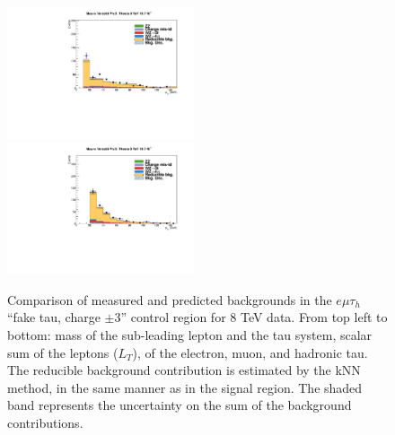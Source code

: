 \begin{figure}
\begin{center}
  \includegraphics[width=0.49\textwidth]{4_Analisys/pics/8TeV/plots/emt/f3/Full_charge3/final-f3-mPt-Full.pdf}\\
  \includegraphics[width=0.49\textwidth]{4_Analisys/pics/8TeV/plots/emt/f3/Full_charge3/final-f3-tPt-Full.pdf}
  \caption{Comparison of measured and predicted backgrounds in the $e\mu\tau_h$ ``fake tau, charge $\pm3$'' control region for 8 TeV data.
  From top left to bottom: mass of the sub-leading lepton and the tau system, scalar sum of the leptons \pT ($L_T$), \pT of the electron, muon, and hadronic tau.
  The reducible background contribution is estimated by the kNN method, in the same manner as in the signal region.
  The shaded band represents the uncertainty on the sum of the background contributions.
  }
  \label{fig:LLT_emt_f3_charge3_control_8TeV}
\end{center}
\end{figure}


